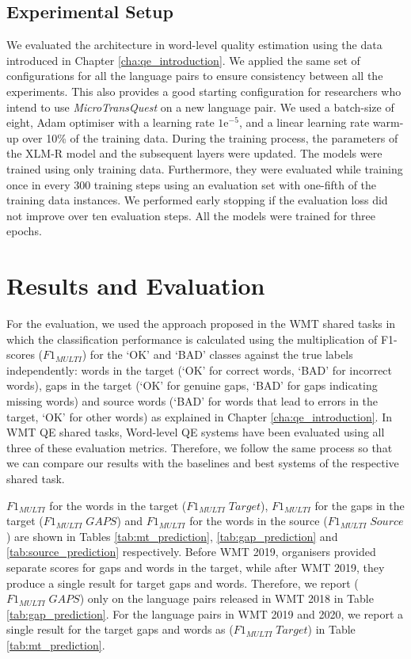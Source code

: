 \subsection{Experimental Setup}
\label{sec:word_level_experiment}
We evaluated the architecture in word-level quality estimation using the data introduced in Chapter \ref{cha:qe_introduction}. We applied the same set of configurations for all the language pairs to ensure consistency between all the experiments. This also provides a good starting configuration for researchers who intend to use \textit{MicroTransQuest} on a new language pair. We used a batch-size of eight, Adam optimiser with a learning rate $1\mathrm{e}^{-5}$, and a linear learning rate warm-up over 10\% of the training data. During the training process, the parameters of the XLM-R model and the subsequent layers were updated. The models were trained using only training data. Furthermore, they were evaluated while training once in every 300 training steps using an evaluation set with one-fifth of the training data instances. We performed early stopping if the evaluation loss did not improve over ten evaluation steps. All the models were trained for three epochs.

\section{Results and Evaluation}
\label{sec:word_level_results}
For the evaluation, we used the approach proposed in the WMT shared tasks in which the classification performance is calculated using the multiplication of F1-scores ($F1_{\textit{MULTI}}$) for the `OK' and `BAD' classes against the true labels
independently: words in the target (`OK' for correct words, `BAD' for incorrect words), gaps in the target (`OK' for genuine gaps, `BAD' for gaps indicating missing words) and source words (`BAD' for words that lead to errors in the target, `OK' for other words) \autocite{specia-etal-2018-findings} as explained in Chapter \ref{cha:qe_introduction}. In WMT QE shared tasks, Word-level QE systems have been evaluated using all three of these evaluation metrics. Therefore, we follow the same process so that we can compare our results with the baselines and best systems of the respective shared task.

$F1_{\textit{MULTI}}$ for the words in the target ($F1_{\textit{MULTI}} \; Target$), $F1_{\textit{MULTI}}$ for the gaps in the target ($F1_{\textit{MULTI}} \; GAPS$) and $F1_{\textit{MULTI}}$ for the words in the source  ($F1_{\textit{MULTI}} \; Source$) are shown in Tables \ref{tab:mt_prediction}, \ref{tab:gap_prediction} and \ref{tab:source_prediction} respectively. Before WMT 2019, organisers provided separate scores for gaps and words in the target, while after WMT 2019, they produce a single result for target gaps and words. Therefore, we report ($F1_{\textit{MULTI}} \; GAPS$) only on the language pairs released in WMT 2018 in Table \ref{tab:gap_prediction}. For the language pairs in WMT 2019 and 2020, we report a single result for the target gaps and words as ($F1_{\textit{MULTI}} \; Target$) in Table \ref{tab:mt_prediction}.

